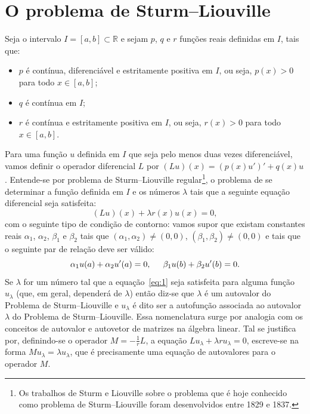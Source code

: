 \documentclass[10pt,a4paper]{article}
\begin{document}
	\section{O problema de Sturm--Liouville}
	Seja o intervalo $I=[a,b]\subset\mathbb{R}$ e sejam $p$, $q$ e $r$ funções reais definidas em $I$, tais que:
	\begin{itemize}
		\item $p$ é contínua, diferenciável e estritamente positiva em $I$, ou seja, $p(x)>0$ para todo $x\in[a,b]$;
		\item $q$ é contínua em $I$;
		\item $r$ é contínua e estritamente positiva em $I$, ou seja, $r(x)>0$ para todo $x\in[a,b]$.
	\end{itemize}
	Para uma função $u$ definida em $I$ que seja pelo menos duas vezes diferenciável, vamos definir o operador diferencial $L$ por $(Lu)(x)=(p(x)u')'+q(x)u$. Entende-se por problema de Sturm--Liouville regular\footnote{Os trabalhos de Sturm e Liouville sobre o problema que é hoje conhecido como problema de Sturm--Liouville foram desenvolvidos entre 1829 e 1837.}, o problema de se determinar a função definida em $I$ e os números $\lambda$ tais que a seguinte equação diferencial seja satisfeita:
	\begin{equation}
		(Lu)(x) + \lambda r(x)u(x) = 0,
		\label{eq:1}
	\end{equation}
	com o seguinte tipo de condição de contorno: vamos supor que existam constantes reais $\alpha_1$, $\alpha_2$, $\beta_1$ e $\beta_2$ tais que $(\alpha_1,\alpha_2)\neq (0,0)$, $(\beta_1,\beta_2)\neq (0,0)$ e tais que o seguinte par de relação deve ser válido:
	\begin{equation}
		\alpha_1 u(a) + \alpha_2 u'(a) = 0, \hspace{0.5cm} \beta_1 u(b) + \beta_2 u'(b)=0.
	\end{equation}
	Se $\lambda$ for um número tal que a equação~\ref{eq:1} seja satisfeita para alguma função $u_\lambda$ (que, em geral, dependerá de $\lambda$) então diz-se que $\lambda$ é um autovalor do Problema de Sturm--Liouville e $u_\lambda$ é dito ser a autofunção associada ao autovalor $\lambda$ do Problema de Sturm--Liouville. Essa nomenclatura surge por analogia com os conceitos de autovalor e autovetor de matrizes na álgebra linear. Tal se justifica por, definindo-se o operador $M=-\frac{1}{r}L$, a equação $Lu_\lambda + \lambda ru_\lambda=0$, escreve-se na forma $Mu_\lambda=\lambda u_\lambda$, que é precisamente uma equação de autovalores para o operador $M$.
\end{document}
